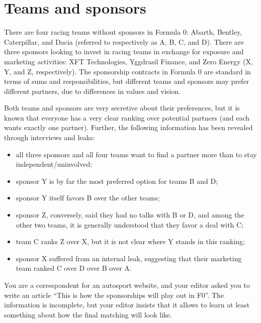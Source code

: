 \documentclass[a4paper]{article}
\begin{document}
\section{Teams and sponsors}
There are four racing teams without sponsors in Formula 0: Abarth,
Bentley, Caterpillar, and Dacia (referred to respectively as A, B, C,
and D). There are three sponsors looking to invest in racing teams in
exchange for exposure and marketing activities: XFT Technologies,
Yggdrasil Finance, and Zero Energy (X, Y, and Z, respectively).
The sponsorship contracts in Formula 0 are standard in terms of sums and
responsibilities, but different teams and sponsors may prefer different
partners, due to differences in values and vision.

Both teams and sponsors are very secretive about their preferences, but
it is known that everyone has a very clear ranking over potential
partners (and each wants exactly one partner). Further, the following 
information has been revealed through interviews and leaks:
\begin{itemize}
	\item all three sponsors and all four teams want to find a partner more
	than to stay independent/uninvolved;
	\item sponsor Y is by far the most preferred option for teams B and D;
	\item sponsor Y itself favors B over the other teams;
	\item sponsor Z, conversely, said they had no talks with B or D, and
	among the other two teams, it is generally understood that they favor a
	deal with C;
	\item team C ranks Z over X, but it is not clear where Y stands in this
	ranking;
	\item sponsor X suffered from an internal leak, suggesting that their
	marketing team ranked C over D over B over A.
\end{itemize}
You are a correspondent for an autosport website, and your editor asked
you to write an article ``This is how the sponsorships will play out in
F0''. The information is incomplete, but your editor insists that it
allows to learn at least something about how the final matching will
look like.
\end{document}
